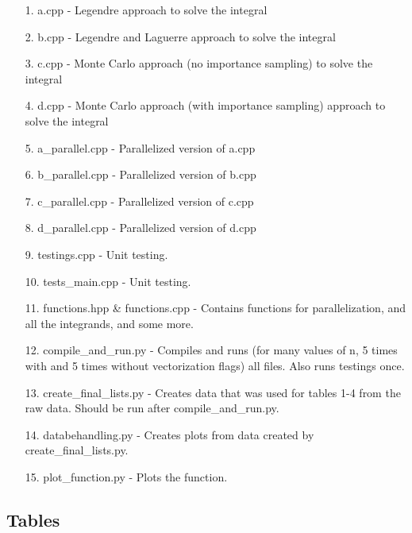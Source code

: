 \documentclass[10pt,a4paper]{article}
\begin{document}
\begin{itemize}
\item[1.] a.cpp - Legendre approach to solve the integral
\item[2.] b.cpp - Legendre and Laguerre approach to solve the integral
\item[3.] c.cpp - Monte Carlo approach (no importance sampling) to solve the integral
\item[4.] d.cpp - Monte Carlo approach (with importance sampling)  approach to solve the integral
\item[5.] a\_parallel.cpp - Parallelized version of a.cpp
\item[6.] b\_parallel.cpp - Parallelized version of b.cpp
\item[7.] c\_parallel.cpp - Parallelized version of c.cpp
\item[8.] d\_parallel.cpp - Parallelized version of d.cpp
\item[9.] testings.cpp - Unit testing.
\item[10.] tests\_main.cpp - Unit testing.
\item[11.] functions.hpp \& functions.cpp - Contains functions for parallelization, and all the integrands, and some more.
\item[12.] compile\_and\_run.py - Compiles and runs (for many values of n, 5 times with and 5 times without vectorization flags) all files. Also runs testings once.
\item[13.] create\_final\_lists.py - Creates data that was used for tables 1-4 from the raw data. Should be run after compile\_and\_run.py.
\item[14.] databehandling.py - Creates plots from data created by create\_final\_lists.py.
\item[15.] plot\_function.py - Plots the function.
\end{itemize}

\subsection{Tables}





\begin{comment}

$$
\begin{bmatrix}
0 & 0 & 0 & 0 \\
0 & 0 & 0 & 0 \\
0 & 0 & 0 & 0 \\
0 & 0 & 0 & 0 \\
\end{bmatrix}
$$

\begin{lstlisting}[caption=insert caption]
for (unsigned int i = 0; i<100;i++{
}
\end{lstlisting}

\begin{figure}[h]
\texttt{[image: ]}
\caption{include caption}
\end{figure}

\end{comment}
\end{document}
